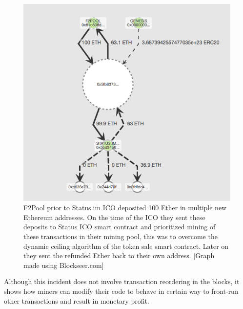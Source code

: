 \begin{figure}[h]
\centering
\includegraphics[width=0.7\linewidth]{figures/F2Pool_transactions_to_StatusICO_and_Refunds.png}
\caption{F2Pool prior to Status.im ICO deposited 100 Ether in multiple new Ethereum addresses. On the time of the ICO they sent these deposits to Status ICO smart contract and prioritized mining of these transactions in their mining pool, this was to overcome the dynamic ceiling algorithm of the token sale smart contract. Later on they sent the refunded Ether back to their own address. [Graph made using Blockseer.com] \label{fig:f2poolfront-run}}
\end{figure}


Although this incident does not involve transaction reordering in the blocks, it shows how miners can modify their code to behave in certain way to front-run other transactions and result in monetary profit. 






